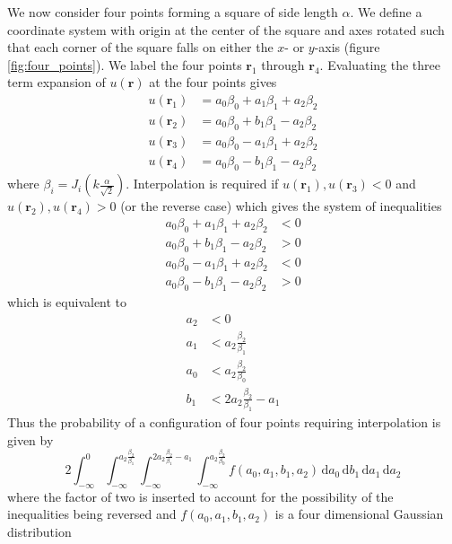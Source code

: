 \documentclass{report}
\newcommand{\rr}[0]{\mathbf{r}}
\newcommand{\ud}{\,\mathrm{d}}
\begin{document}
We now consider four points forming a square of side length $\alpha$. We define a coordinate system with origin at the center of the square and axes rotated such that each corner of the square falls on either the $x$- or $y$-axis (figure \ref{fig:four_points}). We label the four points $\rr_{1}$ through $\rr_{4}$. Evaluating the three term expansion of $u(\rr)$ at the four points gives
\begin{align*}
  u(\rr_{1}) & = a_{0} \beta_{0} + a_{1} \beta_{1} + a_{2} \beta_{2} \\
  u(\rr_{2}) & = a_{0} \beta_{0} + b_{1} \beta_{1} - a_{2} \beta_{2} \\
  u(\rr_{3}) & = a_{0} \beta_{0} - a_{1} \beta_{1} + a_{2} \beta_{2} \\
  u(\rr_{4}) & = a_{0} \beta_{0} - b_{1} \beta_{1} - a_{2} \beta_{2}
\end{align*}
where $\beta_{i} = J_{i} \left( k \frac{\alpha}{\sqrt{2}} \right)$. Interpolation is required if $u(\rr_{1}), u(\rr_{3}) < 0$ and $u(\rr_{2}), u(\rr_{4}) > 0$ (or the reverse case) which gives the system of inequalities
\begin{align*}
  a_{0} \beta_{0} + a_{1} \beta_{1} + a_{2} \beta_{2} & < 0 \\
  a_{0} \beta_{0} + b_{1} \beta_{1} - a_{2} \beta_{2} & > 0 \\
  a_{0} \beta_{0} - a_{1} \beta_{1} + a_{2} \beta_{2} & < 0 \\
  a_{0} \beta_{0} - b_{1} \beta_{1} - a_{2} \beta_{2} & > 0
\end{align*}
which is equivalent to
\begin{align*}
  a_{2} & < 0 \\
  a_{1} & < a_{2} \frac{\beta_{2}}{\beta_{1}} \\
  a_{0} & < a_{2} \frac{\beta_{2}}{\beta_{0}} \\
  b_{1} & < 2 a_{2} \frac{\beta_{2}}{\beta_{1}} - a_{1}
\end{align*}
Thus the probability of a configuration of four points requiring interpolation is given by
\begin{equation}
  2 \int_{-\infty}^{0} \int_{-\infty}^{a_{2} \frac{\beta_{2}}{\beta_{1}}} \int_{-\infty}^{2 a_{2} \frac{\beta_{2}}{\beta_{1}} - a_{1}} \int_{-\infty}^{a_{2} \frac{\beta_{2}}{\beta_{0}}} f(a_{0}, a_{1}, b_{1}, a_{2}) \ud a_{0} \ud b_{1} \ud a_{1} \ud a_{2}
\end{equation}
where the factor of two is inserted to account for the possibility of the inequalities being reversed and $f(a_{0}, a_{1}, b_{1}, a_{2})$ is a four dimensional Gaussian distribution
\end{document}
